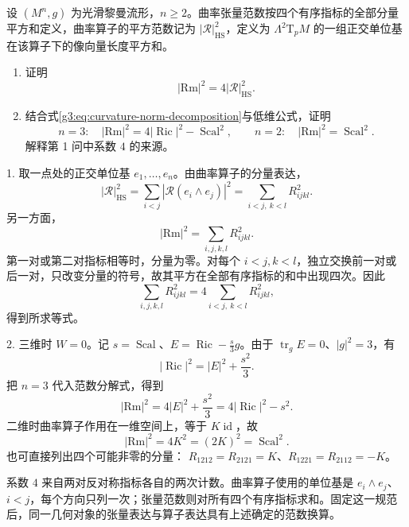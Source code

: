 \begin{exercise}\label{g3:ex:curvature-tensor-operator-norm}
	设 \((M^n,g)\) 为光滑黎曼流形，\(n\ge2\)。曲率张量范数按四个有序指标的全部分量平方和定义，曲率算子的平方范数记为 \(|\mathcal R|_{\mathrm{HS}}^2\)，定义为 \(\Lambda^2\mathrm{T}_pM\) 的一组正交单位基在该算子下的像向量长度平方和。
	\begin{enumerate}
		\item 证明
		\[
			|\mathrm{Rm}|^2=4|\mathcal R|_{\mathrm{HS}}^2.
		\]
		\item 结合式\eqref{g3:eq:curvature-norm-decomposition}与低维公式，证明
		\[
			n=3:\quad|\mathrm{Rm}|^2=4|\operatorname{Ric}|^2
				-\operatorname{Scal}^2,
			\qquad
			n=2:\quad|\mathrm{Rm}|^2=\operatorname{Scal}^2.
		\]
		解释第 1 问中系数 \(4\) 的来源。
	\end{enumerate}
\end{exercise}
\begin{solution}
	1. 取一点处的正交单位基 \(e_1,\ldots,e_n\)。由曲率算子的分量表达，
	\[
		|\mathcal R|_{\mathrm{HS}}^2
		=\sum_{i<j}|\mathcal R(e_i\wedge e_j)|^2
		=\sum_{i<j,\ k<l}R_{ijkl}^2.
	\]
	另一方面，
	\[
		|\mathrm{Rm}|^2=\sum_{i,j,k,l}R_{ijkl}^2.
	\]
	第一对或第二对指标相等时，分量为零。对每个 \(i<j,k<l\)，独立交换前一对或后一对，只改变分量的符号，故其平方在全部有序指标的和中出现四次。因此
	\[
		\sum_{i,j,k,l}R_{ijkl}^2
		=4\sum_{i<j,\ k<l}R_{ijkl}^2,
	\]
	得到所求等式。

	2. 三维时 \(W=0\)。记 \(s=\operatorname{Scal}\)、\(E=\operatorname{Ric}-\tfrac{s}{3}g\)。由于 \(\operatorname{tr}_gE=0\)、\(|g|^2=3\)，有
	\[
		|\operatorname{Ric}|^2=|E|^2+\frac{s^2}{3}.
	\]
	把 \(n=3\) 代入范数分解式，得到
	\[
		|\mathrm{Rm}|^2
		=4|E|^2+\frac{s^2}{3}
		=4|\operatorname{Ric}|^2-s^2.
	\]
	二维时曲率算子作用在一维空间上，等于 \(K\operatorname{id}\)，故
	\[
		|\mathrm{Rm}|^2=4K^2=(2K)^2=\operatorname{Scal}^2.
	\]
	也可直接列出四个可能非零的分量：
	\(R_{1212}=R_{2121}=K\)、\(R_{1221}=R_{2112}=-K\)。

	系数 \(4\) 来自两对反对称指标各自的两次计数。曲率算子使用的单位基是 \(e_i\wedge e_j\)、\(i<j\)，每个方向只列一次；张量范数则对所有四个有序指标求和。固定这一规范后，同一几何对象的张量表达与算子表达具有上述确定的范数换算。
\end{solution}

